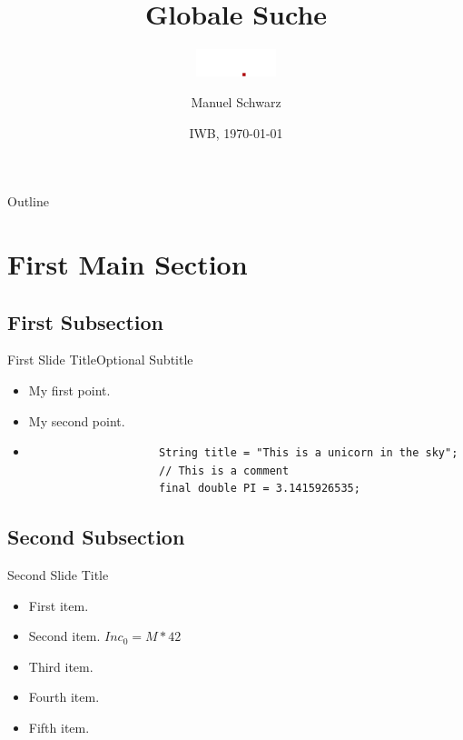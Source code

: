 \documentclass{beamer}
\title{Globale Suche}
\subtitle{\includegraphics[height=8mm]{../img/studip-logo@2x}}
\author{Manuel Schwarz}
\institute[Uni Osnabrück]{\inst{} virtUOS\\ Universität Osnabrück}
\date{IWB, \today}
\begin{document}
\begin{frame}
    \titlepage
\end{frame}

\begin{frame}{Outline}
    \tableofcontents
\end{frame}

\section{First Main Section}

\subsection{First Subsection}

\begin{frame}[fragile]{First Slide Title}{Optional Subtitle}
    \begin{itemize}
        \item {My first point.\pause}
        \item {My second point.\pause}
        \item[]{\begin{verbatim}
                    String title = "This is a unicorn in the sky";
                    // This is a comment
                    final double PI = 3.1415926535;
                \end{verbatim}
        }
    \end{itemize}
\end{frame}

\subsection{Second Subsection}

\begin{frame}{Second Slide Title}
    \begin{itemize}
        \item {First item.
            \pause %
        }
        \item {Second item. $Inc_{0} = M * 42$}
  \item<3-> {Third item.}
  \item<4-> {Fourth item.}
  \item<5-> {Fifth item. }
  \end{itemize}
\end{frame}
\end{document}
